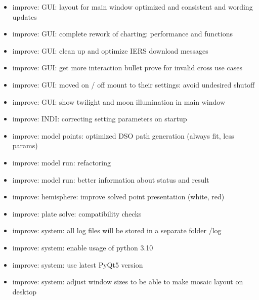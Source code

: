 \documentclass[a4paper,10pt,english]{sphinxmanual}
\begin{document}
\begin{itemize}
\item {} 
\sphinxAtStartPar
improve: GUI: layout for main window optimized and consistent and wording updates

\item {} 
\sphinxAtStartPar
improve: GUI: complete rework of charting: performance and functions

\item {} 
\sphinxAtStartPar
improve: GUI: clean up and optimize IERS download messages

\item {} 
\sphinxAtStartPar
improve: GUI: get more interaction bullet prove for invalid cross use cases

\item {} 
\sphinxAtStartPar
improve: GUI: moved on / off mount to their settings: avoid undesired shutoff

\item {} 
\sphinxAtStartPar
improve: GUI: show twilight and moon illumination in main window

\item {} 
\sphinxAtStartPar
improve: INDI: correcting setting parameters on startup

\item {} 
\sphinxAtStartPar
improve: model points: optimized DSO path generation (always fit, less params)

\item {} 
\sphinxAtStartPar
improve: model run: refactoring

\item {} 
\sphinxAtStartPar
improve: model run: better information about status and result

\item {} 
\sphinxAtStartPar
improve: hemisphere: improve solved point presentation (white, red)

\item {} 
\sphinxAtStartPar
improve: plate solve: compatibility checks

\item {} 
\sphinxAtStartPar
improve: system: all log files will be stored in a separate folder /log

\item {} 
\sphinxAtStartPar
improve: system: enable usage of python 3.10

\item {} 
\sphinxAtStartPar
improve: system: use latest PyQt5 version

\item {} 
\sphinxAtStartPar
improve: system: adjust window sizes to be able to make mosaic layout on desktop


\end{itemize}
\end{document}
